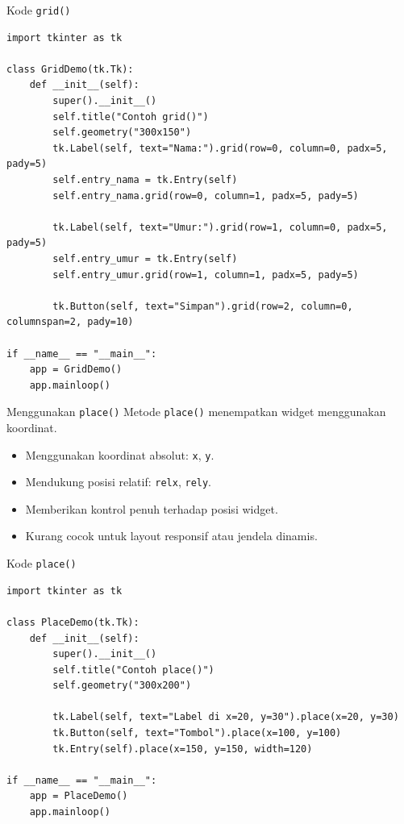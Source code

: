 \documentclass[aspectratio=169, table]{beamer}
\begin{document}
\begin{frame}[fragile]{Kode \texttt{grid()}}
\vspace{20pt}
\begin{lstlisting}[style=PythonStyle, basicstyle=\ttfamily\scriptsize]
import tkinter as tk

class GridDemo(tk.Tk):
    def __init__(self):
        super().__init__()
        self.title("Contoh grid()")
        self.geometry("300x150")
        tk.Label(self, text="Nama:").grid(row=0, column=0, padx=5, pady=5)
        self.entry_nama = tk.Entry(self)
        self.entry_nama.grid(row=0, column=1, padx=5, pady=5)

        tk.Label(self, text="Umur:").grid(row=1, column=0, padx=5, pady=5)
        self.entry_umur = tk.Entry(self)
        self.entry_umur.grid(row=1, column=1, padx=5, pady=5)

        tk.Button(self, text="Simpan").grid(row=2, column=0, columnspan=2, pady=10)

if __name__ == "__main__":
    app = GridDemo()
    app.mainloop()
\end{lstlisting}
\end{frame}


\begin{frame}[fragile]{Menggunakan \texttt{place()}}
\vspace{20pt}
Metode \texttt{place()} menempatkan widget menggunakan koordinat.

\begin{itemize}
    \item Menggunakan koordinat absolut: \texttt{x}, \texttt{y}.
    \item Mendukung posisi relatif: \texttt{relx}, \texttt{rely}.
    \item Memberikan kontrol penuh terhadap posisi widget.
    \item Kurang cocok untuk layout responsif atau jendela dinamis.
\end{itemize}
\end{frame}

\begin{frame}[fragile]{Kode \texttt{place()}}
\vspace{20pt}
\begin{lstlisting}[style=PythonStyle, basicstyle=\ttfamily\scriptsize]
import tkinter as tk

class PlaceDemo(tk.Tk):
    def __init__(self):
        super().__init__()
        self.title("Contoh place()")
        self.geometry("300x200")

        tk.Label(self, text="Label di x=20, y=30").place(x=20, y=30)
        tk.Button(self, text="Tombol").place(x=100, y=100)
        tk.Entry(self).place(x=150, y=150, width=120)

if __name__ == "__main__":
    app = PlaceDemo()
    app.mainloop()
\end{lstlisting}
\end{frame}
\end{document}

